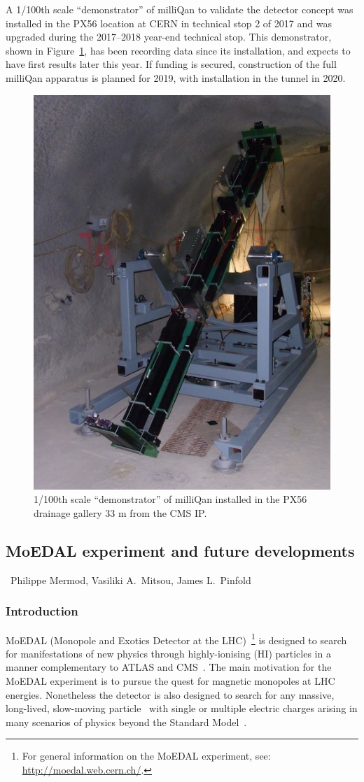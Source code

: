  
 A 1/100th scale ``demonstrator'' of milliQan to validate the detector concept was installed in the PX56 location at CERN in technical stop 2 of 2017 and was upgraded during the 2017--2018 year-end technical stop. This demonstrator, shown in Figure~\ref{fig:demo}, has been recording data since its installation, and expects to have first results later this year. If funding is secured, construction of the full milliQan apparatus is planned for 2019, with installation in the tunnel in 2020. 

\begin{figure}[h]
   \centering
   \includegraphics[width=0.5\linewidth]{figures/milliqan/RIMG0141.jpg}
   \caption{ 1/100th scale ``demonstrator'' of milliQan installed in the PX56 drainage gallery 33 m from the CMS IP.
\label{fig:demo}}
\end{figure}


\subsection{MoEDAL experiment and future developments}
\label{sec:MoEDAL}

~Philippe Mermod, Vasiliki A.\ Mitsou, James L.~Pinfold

\subsubsection{Introduction}\label{sc:intro}

MoEDAL (Monopole and Exotics Detector at the LHC)~\cite{Pinfold:2009oia}\footnote{For general information on the MoEDAL experiment, see: \url{http://moedal.web.cern.ch/}.} is designed to search for manifestations of new physics through highly-ionising (HI) particles in a manner complementary to ATLAS and CMS~\cite{DeRoeck:2011aa}. The main motivation for the MoEDAL experiment is to pursue the quest for magnetic monopoles at LHC energies. Nonetheless the detector is also designed to search for any massive,  long-lived, slow-moving particle~\cite{Fairbairn:2006gg,Burdin:2014xma} with single or multiple electric charges arising in many scenarios of physics beyond the Standard Model~\cite{Acharya:2014nyr}. 


